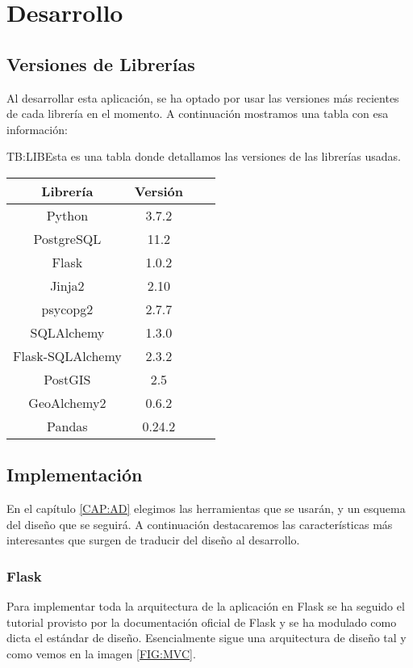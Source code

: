 
\chapter{Desarrollo\label{CAP:DESARROLLO}}
  \section{Versiones de Librerías}
    Al desarrollar esta aplicación, se ha optado por usar las versiones más recientes de cada librería en el momento. A continuación mostramos una tabla con esa información:

    \begin{table}[Tabla de versiones de librerías]{TB:LIB}{Esta es una tabla donde detallamos las versiones de las librerías usadas.}
      \begin{tabular}{cccc}
        \hline
        \textbf{Librería} & \textbf{Versión} \\
        \hline \hline
        Python & 3.7.2 \\
        PostgreSQL & 11.2 \\
        Flask & 1.0.2 \\
        Jinja2 & 2.10 \\
        psycopg2 & 2.7.7 \\  
        SQLAlchemy & 1.3.0 \\ 
        Flask-SQLAlchemy & 2.3.2 \\
        PostGIS & 2.5 \\
        GeoAlchemy2 & 0.6.2 \\
        Pandas & 0.24.2 \\
        \hline
      \end{tabular}
    \end{table}
  
  
  \section{Implementación}
    En el capítulo \ref{CAP:AD} elegimos las herramientas que se usarán, y un esquema del diseño que se seguirá. A continuación destacaremos las características más interesantes que surgen de traducir del diseño al desarrollo.
    
    \subsection{Flask}
      Para implementar toda la arquitectura de la aplicación en Flask se ha seguido el tutorial provisto por la documentación oficial de Flask \cite{flask} y se ha modulado como dicta el estándar de diseño.
      Esencialmente sigue una arquitectura de diseño  tal y como vemos en la imagen \ref{FIG:MVC}. 
      
